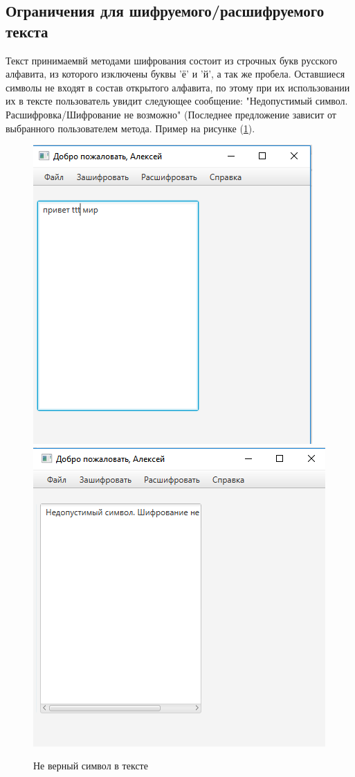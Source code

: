\documentclass[a4paper,12pt]{article}
\begin{document}
\subsection{Ограничения для шифруемого/расшифруемого текста}
Текст принимаемвй методами шифрования состоит из строчных букв русского алфавита, из которого изключены буквы 'ё' и 'й', а так же пробела. Оставшиеся символы не входят в состав открытого алфавита, по этому при их использовании их в тексте пользователь увидит следующее сообщение: "Недопустимый символ. Расшифровка/Шифрование не возможно" (Последнее предложение зависит от выбранного пользователем метода. Пример на рисунке (\ref{fig:wrong_char_and_response}).
\begin{center}
	\begin{figure}[h!]
		\centering
		\includegraphics[scale=0.7]{img/wrong_char.png}
		\includegraphics[scale=0.7]{img/wrong_char_response.png}
		\caption{Не верный символ в тексте}
		\label{fig:wrong_char_and_response}
	\end{figure}
\end{center}
\end{document}
